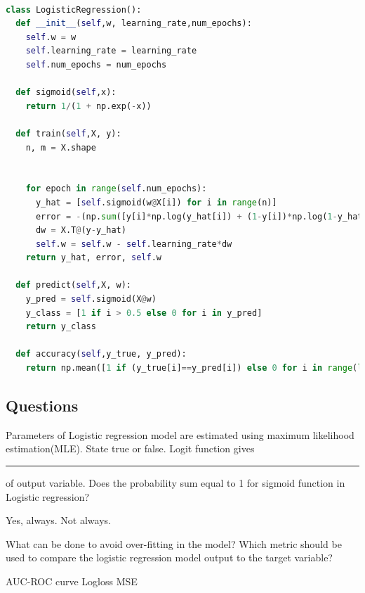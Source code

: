 \documentclass[12pt,letterpaper, onecolumn]{exam}
\begin{document}
\newpage
\begin{lstlisting}[language=Python, caption=Logistic Regression Code]

class LogisticRegression():
  def __init__(self,w, learning_rate,num_epochs):
    self.w = w
    self.learning_rate = learning_rate
    self.num_epochs = num_epochs
   
  def sigmoid(self,x):
    return 1/(1 + np.exp(-x))

  def train(self,X, y):
    n, m = X.shape
    
    
    for epoch in range(self.num_epochs):
      y_hat = [self.sigmoid(w@X[i]) for i in range(n)]
      error = -(np.sum([y[i]*np.log(y_hat[i]) + (1-y[i])*np.log(1-y_hat[i]) for i in range(n)]))
      dw = X.T@(y-y_hat)
      self.w = self.w - self.learning_rate*dw
    return y_hat, error, self.w

  def predict(self,X, w):
    y_pred = self.sigmoid(X@w)
    y_class = [1 if i > 0.5 else 0 for i in y_pred]
    return y_class

  def accuracy(self,y_true, y_pred):
    return np.mean([1 if (y_true[i]==y_pred[i]) else 0 for i in range(len(y_pred))])


\end{lstlisting}

\subsection*{Questions}

\begin{questions}
\question[]Parameters of Logistic regression model are estimated using maximum likelihood estimation(MLE). State true or false.
\question[]Logit function gives \rule{2cm}{0.15mm}of output variable.
\question[] Does the probability sum equal to 1 for sigmoid function in Logistic regression?
\begin{choices}
\choice Yes, always.
\choice Not always.
\end{choices}
\question[] What can be done to avoid over-fitting in the model?
\question[] Which metric should be used to compare the logistic regression model output to the target variable?\\
\begin{oneparchoices}
\choice AUC-ROC curve
\choice Logloss
\choice MSE
\end{oneparchoices}
\end{questions}
\end{document}
